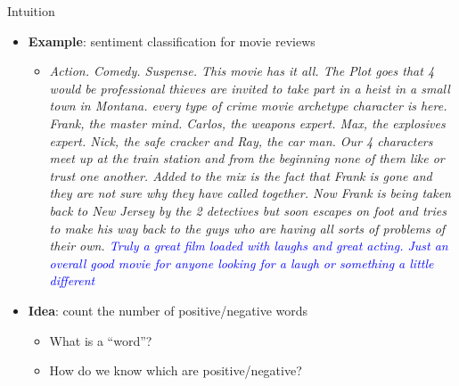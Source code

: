 \documentclass[usenames,dvipsnames,notes,11pt,aspectratio=169]{beamer}
\newcommand{\pdfnote}[1]{}
\begin{document}
\begin{frame}
    {Intuition}
    \begin{itemize}
        \itemsep1em
        \item \textbf{Example}: sentiment classification for movie reviews
    \begin{itemize}
        \item[] {\small {} \textit{Action. Comedy. Suspense. This movie has it
all. The Plot goes that 4 would be
professional thieves are invited to take part in a
heist in a small town in Montana. every type of
crime movie archetype character is here. Frank,
the master mind. Carlos, the weapons expert. Max,
the explosives expert. Nick, the safe cracker and
Ray, the car man. Our 4 characters meet up at the train station
and from the beginning none of them like or trust
one another. Added to the mix is the fact that
Frank is gone and they are not sure why they have
called together. Now Frank is being
taken back to New Jersey by the 2 detectives but
soon escapes on foot and tries to make his way
back to the guys who are having all sorts of
            problems of their own. \textcolor<2->{blue}{Truly a great
film loaded with laughs and great acting. Just an
overall good movie for anyone looking for a laugh
            or something a little different}}\par}
    \end{itemize}
    \pause
\item \textbf{Idea}: count the number of positive/negative words
    \begin{itemize}
        \item What is a ``word''?
        \item How do we know which are positive/negative?
    \end{itemize}

    \end{itemize}
    \pdfnote{
        How would you quickly tell the sentiment of this review?
        Understand everything said in it is hard (genre, plot, actor performance etc.).
        But sometimes a couple of keywords or a concluding sentence is sufficient.
    }
    \pdfnote{
        Now there are two questions left.
        We know what's a word intuitively, but to the computer the input is just a string of unicodes, how can we separate that into a list of words.
        The second question is how can we tell which words are positive or negative. The rule based approach is to construct a dictionary of such words, which can be quite effective.
        But here we'll see how to learn this from labeled data.
    }
\end{frame}
\end{document}
